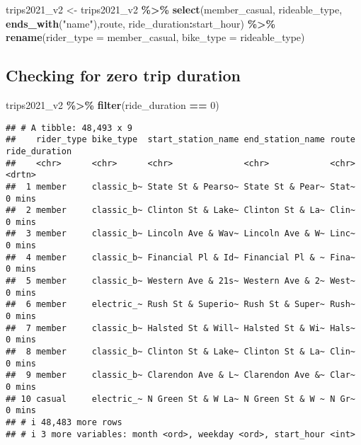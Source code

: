 \documentclass[
]{article}
\newenvironment{Shaded}{\begin{snugshade}}{\end{snugshade}}
\newcommand{\AttributeTok}[1]{\textcolor[rgb]{0.13,0.29,0.53}{#1}}
\newcommand{\DecValTok}[1]{\textcolor[rgb]{0.00,0.00,0.81}{#1}}
\newcommand{\FunctionTok}[1]{\textcolor[rgb]{0.13,0.29,0.53}{\textbf{#1}}}
\newcommand{\NormalTok}[1]{#1}
\newcommand{\OtherTok}[1]{\textcolor[rgb]{0.56,0.35,0.01}{#1}}
\newcommand{\SpecialCharTok}[1]{\textcolor[rgb]{0.81,0.36,0.00}{\textbf{#1}}}
\newcommand{\StringTok}[1]{\textcolor[rgb]{0.31,0.60,0.02}{#1}}
\begin{document}
\begin{Shaded}
\begin{Highlighting}[]
\NormalTok{trips2021\_v2 }\OtherTok{\textless{}{-}}\NormalTok{ trips2021\_v2 }\SpecialCharTok{\%\textgreater{}\%} 
  \FunctionTok{select}\NormalTok{(member\_casual, rideable\_type, }\FunctionTok{ends\_with}\NormalTok{(}\StringTok{"name"}\NormalTok{),route, ride\_duration}\SpecialCharTok{:}\NormalTok{start\_hour) }\SpecialCharTok{\%\textgreater{}\%} 
  \FunctionTok{rename}\NormalTok{(}\AttributeTok{rider\_type =}\NormalTok{ member\_casual, }\AttributeTok{bike\_type =}\NormalTok{ rideable\_type)}
\end{Highlighting}
\end{Shaded}

\hypertarget{checking-for-zero-trip-duration}{%
\subsection{Checking for zero trip
duration}\label{checking-for-zero-trip-duration}}

\begin{Shaded}
\begin{Highlighting}[]
\NormalTok{trips2021\_v2 }\SpecialCharTok{\%\textgreater{}\%} 
  \FunctionTok{filter}\NormalTok{(ride\_duration }\SpecialCharTok{==} \DecValTok{0}\NormalTok{) }
\end{Highlighting}
\end{Shaded}

\begin{verbatim}
## # A tibble: 48,493 x 9
##    rider_type bike_type  start_station_name end_station_name route ride_duration
##    <chr>      <chr>      <chr>              <chr>            <chr> <drtn>       
##  1 member     classic_b~ State St & Pearso~ State St & Pear~ Stat~ 0 mins       
##  2 member     classic_b~ Clinton St & Lake~ Clinton St & La~ Clin~ 0 mins       
##  3 member     classic_b~ Lincoln Ave & Wav~ Lincoln Ave & W~ Linc~ 0 mins       
##  4 member     classic_b~ Financial Pl & Id~ Financial Pl & ~ Fina~ 0 mins       
##  5 member     classic_b~ Western Ave & 21s~ Western Ave & 2~ West~ 0 mins       
##  6 member     electric_~ Rush St & Superio~ Rush St & Super~ Rush~ 0 mins       
##  7 member     classic_b~ Halsted St & Will~ Halsted St & Wi~ Hals~ 0 mins       
##  8 member     classic_b~ Clinton St & Lake~ Clinton St & La~ Clin~ 0 mins       
##  9 member     classic_b~ Clarendon Ave & L~ Clarendon Ave &~ Clar~ 0 mins       
## 10 casual     electric_~ N Green St & W La~ N Green St & W ~ N Gr~ 0 mins       
## # i 48,483 more rows
## # i 3 more variables: month <ord>, weekday <ord>, start_hour <int>
\end{verbatim}
\end{document}
